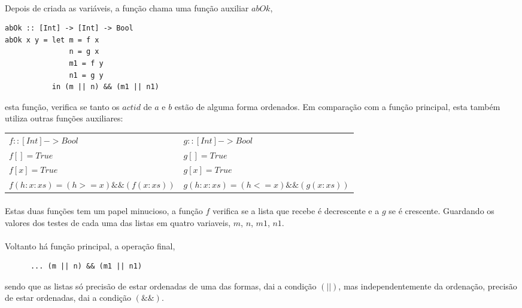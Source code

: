\documentclass[a4paper]{article}
\begin{document}
\begin{enumerate}
\begin{itemize}
\paragraph{}Depois de criada as variáveis, a função chama uma função auxiliar $abOk$,
\begin{verbatim}
abOk :: [Int] -> [Int] -> Bool
abOk x y = let m = f x
               n = g x
               m1 = f y
               n1 = g y
           in (m || n) && (m1 || n1)
\end{verbatim}
esta função, verifica se tanto os $actid$ de $a$ e $b$ estão de alguma forma ordenados. Em comparação com a função principal, esta também utiliza outras funções auxiliares: \\
\newline
\begin{tabular}{l l}
$f :: [Int] -> Bool$ & $g :: [Int] -> Bool$\\
$f [] = True$ & $g [] = True$\\
$f [x] = True$ & $g [x] = True$\\ 
$f (h:x:xs) = (h>=x)\&\&(f (x:xs))$ & $g (h:x:xs) = (h<=x)\&\&(g (x:xs))$\\
\end{tabular}
\newpage
\paragraph{}Estas duas funções tem um papel minucioso, a função $f$ verifica se a lista que recebe é decrescente e a $g$ se é crescente. Guardando os valores dos testes de cada uma das listas em quatro variaveis, $m$, $n$, $m1$, $n1$. 
\paragraph{}Voltanto há função principal, a operação final, 
\begin{verbatim}
      ... (m || n) && (m1 || n1)
\end{verbatim}
sendo que as listas só precisão de estar ordenadas de uma das formas, dai a condição $(||)$, mas independentemente da ordenação, precisão de estar ordenadas, dai a condição $(\&\&)$.\\
\end{itemize}



\end{enumerate}
\end{document}
